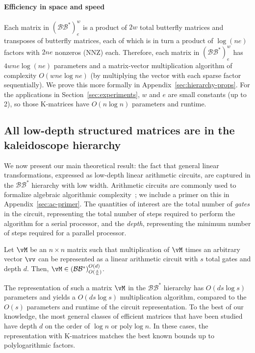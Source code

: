 \paragraph{Efficiency in space and speed} Each matrix in $(\mathcal{B}\mathcal{B}^*)^w_e$ is a product of $2w$ total butterfly matrices and transposes of butterfly matrices, each of which is in turn a product of $\log (ne)$ factors with $2ne$ nonzeros (NNZ) each. Therefore, each matrix in $(\mathcal{B}\mathcal{B}^*)^w_e$ has $4w ne \log (ne)$ parameters and a matrix-vector multiplication algorithm of complexity $O(w ne \log ne)$ (by multiplying the vector with each sparse factor sequentially). We prove this more formally in Appendix~\ref{sec:hierarchy-props}.
For the applications in Section~\ref{sec:experiments}, $w$ and $e$ are small constants (up to 2), so those K-matrices have $O(n \log n)$ parameters and runtime.

\subsection{All low-depth structured matrices are in the kaleidoscope hierarchy}
\label{sec:theory-result}
We now present our main theoretical result: the fact that general linear transformations, expressed as low-depth linear arithmetic circuits, are captured in the $\mathcal{B}\mathcal{B}^*$ hierarchy with low width. Arithmetic circuits are commonly used to formalize algebraic algorithmic complexity~\citep{burgisser2013algebraic}; we include a primer on this in Appendix~\ref{sec:ac-primer}.
The quantities of interest are the total number of \textit{gates} in the circuit, representing the total number of steps required to perform the algorithm for a serial processor, and the \textit{depth}, representing the minimum number of steps required for a parallel processor.

\begin{theorem} \label{thm:ac-bbs}
     Let $\vM$ be an $n \times n$ matrix such that multiplication of $\vM$ times an arbitrary vector $\vv$ can be represented as a linear arithmetic circuit with $s$ total gates and depth $d$. Then, $\vM \in (\mathcal{B}\mathcal{B}^*)^{O(d)}_{O(\frac{s}{n})}$.
\end{theorem}

The representation of such a matrix $\vM$ in the $\mathcal{B}\mathcal{B}^*$ hierarchy has $O(d s \log s)$ parameters and yields a $O(d s \log s)$ multiplication algorithm, compared to the $O(s)$ parameters and runtime of the circuit representation. To the best of our knowledge, the most general classes of efficient matrices that have been studied~\citep{desa2018two} have depth $d$ on the order of
$\log n$ or $\mathrm{poly} \log n$. In these cases, the representation with K-matrices matches the best known bounds up to polylogarithmic factors.

